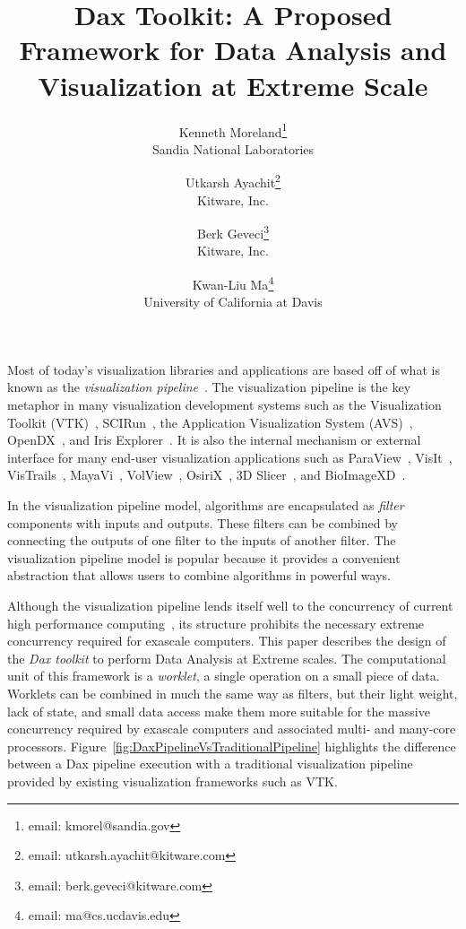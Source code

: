 \documentclass{vgtc}                          %
\title{Dax Toolkit: A Proposed Framework for Data Analysis and Visualization at Extreme Scale}
\author{
  Kenneth Moreland\thanks{email: kmorel@sandia.gov} \\ %
  \scriptsize Sandia National Laboratories %
  \and %
  Utkarsh Ayachit\thanks{email: utkarsh.ayachit@kitware.com} \\ %
  \scriptsize Kitware, Inc. %
  \and %
  Berk Geveci\thanks{email: berk.geveci@kitware.com} \\ %
  \scriptsize Kitware, Inc. %
  \and %
  Kwan-Liu Ma\thanks{email: ma@cs.ucdavis.edu} \\ %
  \scriptsize University of California at Davis %
}
\newcommand*{\lcite}[1]{~\cite{#1}}
\newcommand*{\keyterm}[1]{\emph{#1}}
\begin{document}


\maketitle

\label{sec:Introduction}

Most of today's visualization libraries and applications are based off of
what is known as the \keyterm{visualization
  pipeline}\lcite{Haeberli88,Lucas92}.  The visualization pipeline is the
key metaphor in many visualization development systems such as the
Visualization Toolkit (VTK)\lcite{VTKBook}, SCIRun\lcite{SCIRunPaper}, the
Application Visualization System (AVS)\lcite{AVSPaper},
OpenDX\lcite{OpenDXPaper}, and Iris Explorer\lcite{IRISExplorerPaper}.  It
is also the internal mechanism or external interface for many end-user
visualization applications such as ParaView\lcite{ParaViewGuideBook},
VisIt\lcite{VisItBook}, VisTrails\lcite{VisTrailsPaper},
MayaVi\lcite{MayaViPaper}, VolView\lcite{VolViewBook},
OsiriX\lcite{OsiriXPaper}, 3D Slicer\lcite{3DSlicerPaper}, and
BioImageXD\lcite{BioImageXDPaper}.

In the visualization pipeline model, algorithms are encapsulated as
\keyterm{filter} components with inputs and outputs.  These filters can
be combined by connecting the outputs of one filter to the inputs of
another filter.  The visualization pipeline model is popular because it
provides a convenient abstraction that allows users to combine algorithms
in powerful ways.

Although the visualization pipeline lends itself well to the concurrency of
current high performance
computing\lcite{Childs10,Moreland08,Patchett09,Pugmire08,White05}, its structure
prohibits the necessary extreme concurrency required for exascale
computers.  This paper describes the design of the \keyterm{Dax toolkit} to
perform Data Analysis at Extreme scales.  The computational unit of this
framework is a \keyterm{worklet}, a single operation on a small piece of data.
Worklets can be combined in much the same way as filters, but their light
weight, lack of state, and small data access make them more suitable for
the massive concurrency required by exascale computers and associated
multi- and many-core processors.
Figure~\ref{fig:DaxPipelineVsTraditionalPipeline} highlights the difference
between a Dax pipeline
execution with a traditional visualization pipeline provided by existing
visualization frameworks such as VTK.
\end{document}
